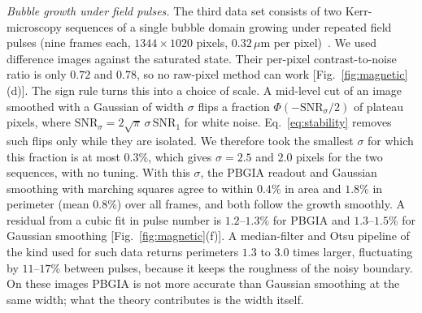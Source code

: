 \documentclass[11pt,a4paper]{article}
\begin{document}
\emph{Bubble growth under field pulses.} The third data set consists of two Kerr-microscopy sequences of a single bubble domain growing under repeated field pulses (nine frames each, $1344\times1020$ pixels, $0.32\,\mu$m per pixel)~\cite{KerrPy}. We used difference images against the saturated state. Their per-pixel contrast-to-noise ratio is only $0.72$ and $0.78$, so no raw-pixel method can work [Fig.~\ref{fig:magnetic}(d)]. The sign rule turns this into a choice of scale. A mid-level cut of an image smoothed with a Gaussian of width $\sigma$ flips a fraction $\Phi(-\mathrm{SNR}_\sigma/2)$ of plateau pixels, where $\mathrm{SNR}_\sigma=2\sqrt\pi\,\sigma\,\mathrm{SNR}_1$ for white noise. Eq.~\eqref{eq:stability} removes such flips only while they are isolated. We therefore took the smallest $\sigma$ for which this fraction is at most $0.3\%$, which gives $\sigma=2.5$ and $2.0$ pixels for the two sequences, with no tuning. With this $\sigma$, the PBGIA readout and Gaussian smoothing with marching squares agree to within $0.4\%$ in area and $1.8\%$ in perimeter (mean $0.8\%$) over all frames, and both follow the growth smoothly. A residual from a cubic fit in pulse number is $1.2$--$1.3\%$ for PBGIA and $1.3$--$1.5\%$ for Gaussian smoothing [Fig.~\ref{fig:magnetic}(f)]. A median-filter and Otsu pipeline of the kind used for such data returns perimeters $1.3$ to $3.0$ times larger, fluctuating by $11$--$17\%$ between pulses, because it keeps the roughness of the noisy boundary. On these images PBGIA is not more accurate than Gaussian smoothing at the same width; what the theory contributes is the width itself.
\end{document}
